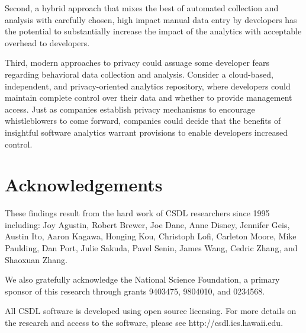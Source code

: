 \documentclass[]{article}
\begin{document}
Second, a hybrid approach that mixes the best of automated collection and analysis with
carefully chosen, high impact manual data entry by developers has the potential to
substantially increase the impact of the analytics with acceptable overhead to developers.

Third, modern approaches to privacy could assuage some developer fears regarding
behavioral data collection and analysis.  Consider a cloud-based, independent, and
privacy-oriented analytics repository, where developers could maintain complete control
over their data and whether to provide management access.  Just as companies establish
privacy mechanisms to encourage whistleblowers to come forward, companies could decide
that the benefits of insightful software analytics warrant provisions to enable developers
increased control.

\section{Acknowledgements}

These findings result from the hard work of CSDL researchers since 1995 including:
Joy Agustin,  
Robert Brewer,
Joe Dane, 
Anne Disney, 
Jennifer Geis, 
Austin Ito, 
Aaron Kagawa,  
Honging Kou, 
Christoph Lofi, 
Carleton Moore, 
Mike Paulding, 
Dan Port,
Julie Sakuda,
Pavel Senin,
James Wang,
Cedric Zhang, and
Shaoxuan Zhang.

We also gratefully acknowledge the National Science Foundation, a primary sponsor of this
research through grants 9403475, 9804010, and 0234568.

All CSDL software is developed using open source licensing.  For more details on the
research and access to the software, please see http://csdl.ics.hawaii.edu.



\end{document}

